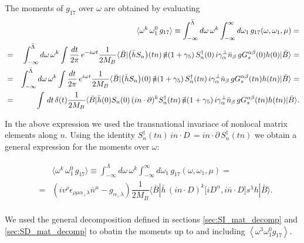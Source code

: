 The moments of $g_{17}$ over $\omega$ are obtained by evaluating
\vspace{-0.3cm}
\begin{eqnarray}\label{eqn:chap5_Generalw}
&&\langle\omega^k\,\omega_1^0\,g_{17}\rangle\equiv\int^{\bar \Lambda}_{-\infty}d\omega\,\omega^k \int^{\infty}_{-\infty}d\omega_1\,g_{17}(\omega,\omega_1,\mu)=\nonumber\\
&=&\int^{\bar \Lambda}_{-\infty}d\omega\,\omega^k  \int\frac{dt}{2\pi}\,e^{-i\omega t} 
\dfrac{1}{2M_B}\langle\bar B| \big(\bar h S_{n}\big)(tn)\,
    \nbslash (1+\gamma_5)\,S_n^\dagger (0)\,
    i\gamma_\alpha^\perp\bar n_\beta\,
   g G_s^{\alpha\beta}(0)
    h(0) |\bar B\rangle=\nonumber\\
&=&\int^{\bar \Lambda}_{-\infty}d\omega\,\omega^k  \int\frac{dt}{2\pi}\,e^{i\omega t} 
\dfrac{1}{2M_B}\langle\bar B| \big(\bar h S_{n}\big)(0)\,
    \nbslash (1+\gamma_5)\,S_n^\dagger (tn)\,
    i\gamma_\alpha^\perp\bar n_\beta\,
   g G_s^{\alpha\beta}(tn)
    h(tn) |\bar B\rangle=\nonumber\\
&=&\int\,dt\,\delta(t)
\dfrac{1}{2M_B}\langle\bar B|\bar h(0) S_{n}(0)\,(in\cdot\partial)^kS_n^\dagger (tn)\,
    \nbslash (1+\gamma_5)\,
    i\gamma_\alpha^\perp\bar n_\beta\,
   g G_s^{\alpha\beta}(tn)
    h(tn) |\bar B\rangle.
        \end{eqnarray}

In the above expression we used the transnational invariace of nonlocal matrix elements along $n$. Using the identity $S_{n}^\dagger(tn)\,in\cdot D\,=in\cdot \partial \,S^\dagger_n(tn)$ we obtain a general expression for the moments over $\omega$:

\begin{eqnarray}
&&\langle\omega^k\,\omega_1^0\,g_{17}\rangle\equiv\int^{\bar \Lambda}_{-\infty}d\omega\,\omega^k \int^{\infty}_{-\infty}d\omega_1\,g_{17}(\omega,\omega_1,\mu)=\nonumber\\
&=&\left(iv^\rho\epsilon_{\rho\mu\alpha_\perp\lambda}\bar n^\mu-g_{\alpha_\perp\lambda}\right)\dfrac{1}{2M_B}\langle\bar B| \bar h \,
   \left(in \cdot D\right)^k\big[iD^\alpha ,i\bar n \cdot D\big]s^\lambda h |\bar B\rangle.\nonumber\\
\end{eqnarray}

We used the general decomposition defined in sections \ref{sec:SI_mat_decomp} and \ref{sec:SD_mat_decomp} to obatin the moments up to and including $\left\langle\omega^{3} \omega_{1}^{0} g_{17}\right\rangle$.

